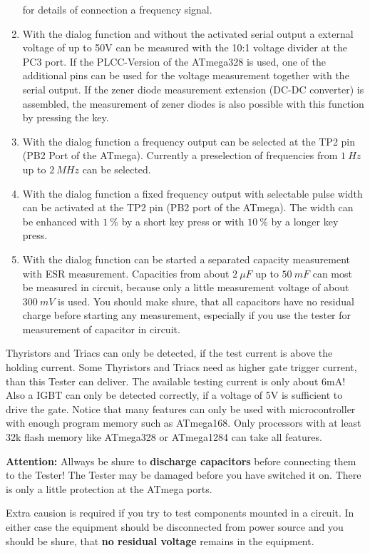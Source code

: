 \begin{enumerate}
for details of connection a frequency signal.
\item With the dialog function and without the activated serial output a external voltage of up to 50V can be measured with
the 10:1 voltage divider at the PC3 port. If the PLCC-Version of the ATmega328 is used, one of the additional
pins can be used for the voltage measurement together with the serial output.
If the zener diode measurement extension (DC-DC converter) is assembled, the measurement of
zener diodes is also possible with this function by pressing the key.
\item With the dialog function a frequency output can be selected at the TP2 pin (PB2 Port of the ATmega).
Currently a preselection of frequencies from \(1~Hz\) up to \(2~MHz\) can be selected.
\item With the dialog function a fixed frequency output with selectable pulse width can be activated at the TP2 pin
(PB2 port of the ATmega). The width can be enhanced with \(1~\%\) by a short key press or with \(10~\%\) by a longer key press.
\item With the dialog function can be started a separated capacity measurement with ESR measurement.
Capacities from about \(2~\mu F\) up to \(50~mF\) can most be measured in circuit, because only a little
measurement voltage of about \(300~mV\) is used.
You should make shure, that all capacitors have no residual charge before starting any measurement,
especially if you use the tester for measurement of capacitor in circuit.

\end{enumerate}

Thyristors and Triacs can only be detected, if the test current is above the holding current.
Some Thyristors and Triacs need as higher gate trigger current, than this Tester can deliver.
The available testing current is only about 6mA!
Also a IGBT can only be detected correctly, if a voltage of 5V is sufficient to drive the gate.
Notice that many features can only be used with microcontroller with enough program memory such as ATmega168.
Only processors with at least 32k flash memory like ATmega328 or ATmega1284 can take all features.

\vspace{1cm}
\textbf{{\Large Attention:}} Allways be shure to {\bf discharge capacitors} before connecting them to the Tester!
The Tester may be damaged before you have switched it on. There is only a little protection at the ATmega ports.

Extra causion is required if you try to test components mounted in a circuit.
In either case the equipment should be disconnected from power source and you should be shure,
that {\bf no residual voltage} remains in the equipment.

